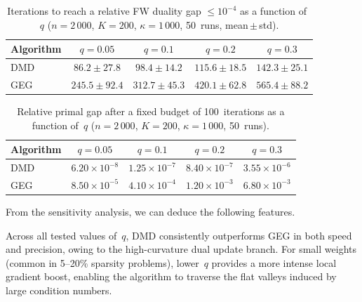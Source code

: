 \documentclass[10pt]{amsart}
\theoremstyle{definition}
\theoremstyle{definition}	 %
\begin{document}
\begin{table}[t]
  \centering
  \caption{Iterations to reach a relative FW duality gap
  $\le 10^{-4}$ as a function of~$q$ ($n=2\,000$, $K=200$,
  $\kappa=1\,000$, 50~runs, mean\,$\pm$\,std).}
  \label{tab:q-iters}
  \begin{tabular}{lcccc}
    \toprule
    Algorithm & $q=0.05$ & $q=0.1$ & $q=0.2$ & $q=0.3$\\
    \midrule
    DMD & $86.2\pm 27.8$ & $98.4\pm 14.2$ & $115.6\pm 18.5$
        & $142.3\pm 25.1$\\
    GEG & $245.5\pm 92.4$ & $312.7\pm 45.3$ & $420.1\pm 62.8$
        & $565.4\pm 88.2$\\
    \bottomrule
  \end{tabular}
\end{table}

\begin{table}[t]
  \centering
  \caption{Relative primal gap after a fixed budget of 100~iterations
  as a function of~$q$ ($n=2\,000$, $K=200$, $\kappa=1\,000$,
  50~runs).}
  \label{tab:q-precision}
  \begin{tabular}{lcccc}
    \toprule
    Algorithm & $q=0.05$ & $q=0.1$ & $q=0.2$ & $q=0.3$\\
    \midrule
    DMD & $6.20\times 10^{-8}$ & $1.25\times 10^{-7}$
        & $8.40\times 10^{-7}$ & $3.55\times 10^{-6}$\\
    GEG & $8.50\times 10^{-5}$ & $4.10\times 10^{-4}$
        & $1.20\times 10^{-3}$ & $6.80\times 10^{-3}$\\
    \bottomrule
  \end{tabular}
\end{table}


From the sensitivity analysis, we can deduce the following features.


        
        \vspace{2mm}
        
        Across all tested values of~$q$, DMD consistently outperforms GEG in both speed and precision, owing to the high-curvature dual update branch.  For small weights (common in 5--20\% sparsity problems), lower~$q$ provides a more intense local gradient boost, enabling the algorithm to traverse the flat valleys induced by large condition numbers.
\end{document}
